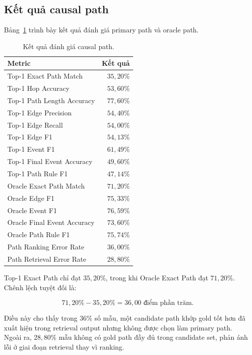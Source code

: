 \subsection{Kết quả causal path}

Bảng~\ref{tab:path-results} trình bày kết quả đánh giá primary path và oracle
path.

\begin{table}[t]
    \centering
    \caption{Kết quả đánh giá causal path.}
    \label{tab:path-results}
    \begin{tabular}{lr}
        \hline
        \textbf{Metric} & \textbf{Kết quả} \\
        \hline
        Top-1 Exact Path Match & \(35{,}20\%\) \\
        Top-1 Hop Accuracy & \(53{,}60\%\) \\
        Top-1 Path Length Accuracy & \(77{,}60\%\) \\
        Top-1 Edge Precision & \(54{,}40\%\) \\
        Top-1 Edge Recall & \(54{,}00\%\) \\
        Top-1 Edge F1 & \(54{,}13\%\) \\
        Top-1 Event F1 & \(61{,}49\%\) \\
        Top-1 Final Event Accuracy & \(49{,}60\%\) \\
        Top-1 Path Rule F1 & \(47{,}14\%\) \\
        \hline
        Oracle Exact Path Match & \(71{,}20\%\) \\
        Oracle Edge F1 & \(75{,}33\%\) \\
        Oracle Event F1 & \(76{,}59\%\) \\
        Oracle Final Event Accuracy & \(73{,}60\%\) \\
        Oracle Path Rule F1 & \(75{,}74\%\) \\
        \hline
        Path Ranking Error Rate & \(36{,}00\%\) \\
        Path Retrieval Error Rate & \(28{,}80\%\) \\
        \hline
    \end{tabular}
\end{table}

Top-1 Exact Path chỉ đạt \(35{,}20\%\), trong khi Oracle Exact Path đạt
\(71{,}20\%\). Chênh lệch tuyệt đối là:

\[
71{,}20\% - 35{,}20\% = 36{,}00
\text{ điểm phần trăm}.
\]

Điều này cho thấy trong \(36\%\) số mẫu, một candidate path khớp gold tốt hơn
đã xuất hiện trong retrieval output nhưng không được chọn làm primary path.
Ngoài ra, \(28{,}80\%\) mẫu không có gold path đầy đủ trong candidate set,
phản ánh lỗi ở giai đoạn retrieval thay vì ranking.

